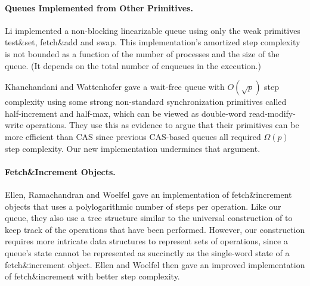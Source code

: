 
\paragraph{Queues Implemented from Other Primitives.}
Li \cite{Li01} implemented a non-blocking linearizable queue using only the weak primitives
test\&set, fetch\&add and swap.
This implementation's amortized step complexity is not bounded
as a function of the number of processes and the size of the queue.
(It depends on the total number of enqueues in the execution.)


Khanchandani and Wattenhofer \cite{KW18} gave a wait-free queue 
with $O(\sqrt{p})$ step complexity using some strong non-standard synchronization primitives
called half-increment and half-max, which can be viewed as 
double-word read-modify-write operations.
They use this as evidence to argue that their primitives can be more efficient than CAS
since previous CAS-based queues all required $\Omega(p)$ step complexity.
Our new implementation undermines that argument.

\paragraph{Fetch\&Increment Objects.}
Ellen, Ramachandran and Woelfel \cite{ERW12} gave an implementation of 
fetch\&increment objects that uses a polylogarithmic number of steps per operation.
Like our queue, they also use a tree structure similar to the universal construction of 
\cite{DBLP:conf/stoc/AfekDT95} to keep track of the operations
that have been performed.
However, our construction requires more intricate
data structures to represent sets of operations, since a queue's state cannot be represented as succinctly
as the single-word state of a fetch\&increment object.
Ellen and Woelfel \cite{10.1007/978-3-642-41527-2_20} then gave an improved implementation of fetch\&increment with better step complexity.

